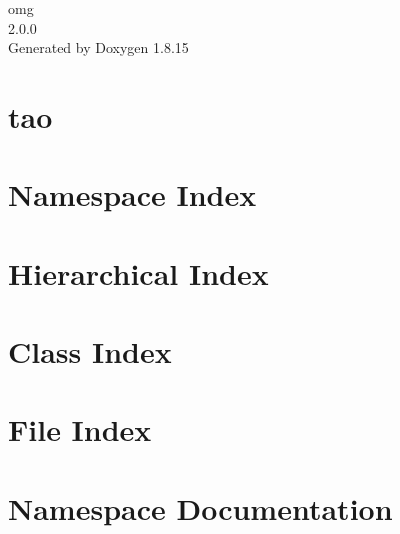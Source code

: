 \let\mypdfximage\pdfximage\def\pdfximage{\immediate\mypdfximage}\documentclass[twoside]{book}
\newcommand{\+}{\discretionary{\mbox{\scriptsize$\hookleftarrow$}}{}{}}
\newcommand{\clearemptydoublepage}{%
  \newpage{\pagestyle{empty}\cleardoublepage}%
}
\begin{document}
\hypersetup{pageanchor=false,
             bookmarksnumbered=true,
             pdfencoding=unicode
            }
\begin{titlepage}
\vspace*{7cm}
\begin{center}%
{\Large omg \\[1ex]\large 2.\+0.\+0 }\\
\vspace*{1cm}
{\large Generated by Doxygen 1.8.15}\\
\end{center}
\end{titlepage}
\clearemptydoublepage
{}
\tableofcontents
\clearemptydoublepage
{}
\hypersetup{pageanchor=true}

\chapter{tao}
\label{md__home_vitorgreati_git-repos_omg_sources_extern_tao__r_e_a_d_m_e}

\chapter{Namespace Index}

\chapter{Hierarchical Index}

\chapter{Class Index}

\chapter{File Index}

\chapter{Namespace Documentation}


\end{document}
